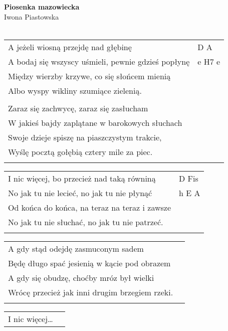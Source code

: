 \documentclass[a5paper]{article}
\begin{document}


\noindent
\fontsize{12pt}{15pt}\selectfont
\textbf{Piosenka mazowiecka} \\
\fontsize{8pt}{10pt}\selectfont
Iwona Piastowska \\ \\
\fontsize{10pt}{12pt}\selectfont
{}
\begin{tabular}{@{}p{8.50cm}p{3cm}@{}}
\noindent
A jeżeli wiosną przejdę nad głębinę & D A \\
A bodaj się wszyscy uśmieli, pewnie gdzieś popłynę & e H7 e \\
Między wierzby krzywe, co się słońcem mienią \\
Albo wyspy wikliny szumiące zielenią. \\ \\

Zaraz się zachwycę, zaraz się zasłucham \\
W jakieś bajdy zaplątane w barokowych słuchach \\
Swoje dzieje spiszę na piaszczystym trakcie,\\
Wyślę pocztą gołębią cztery mile za piec.\\ \\
\end{tabular}

\noindent
\begin{tabular}{@{}p{7.50cm}p{3cm}@{}}
        I nic więcej, bo przecież nad taką równiną & D Fis \\
        No jak tu nie lecieć, no jak tu nie płynąć & h E A \\
        Od końca do końca, na teraz na teraz i zawsze \\
        No jak tu nie słuchać, no jak tu nie patrzeć. \\ \\
\end{tabular}

\noindent
\begin{tabular}{@{}p{7.50cm}p{3cm}@{}}
A gdy stąd odejdę zasmuconym sadem \\
Będę długo spać jesienią w kącie pod obrazem\\
A gdy się obudzę, choćby mróz był wielki\\
Wrócę przecież jak inni drugim brzegiem rzeki.\\ \\
\end{tabular}

\noindent
\begin{tabular}{@{}p{7.50cm}p{3cm}@{}}
        I nic więcej…
\end{tabular}
\end{document}
